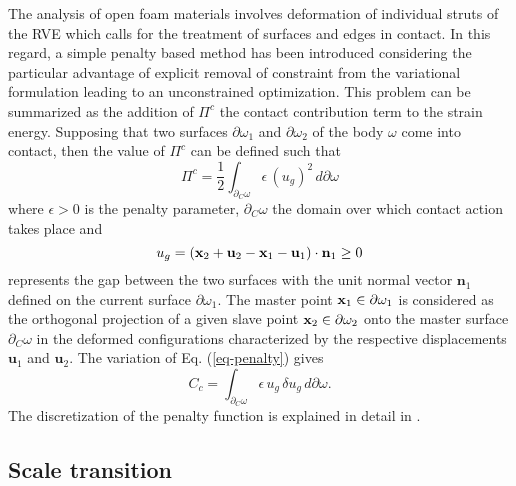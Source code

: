 The analysis of open foam materials involves deformation of individual struts of the RVE which calls for the treatment of surfaces and edges in contact. In this regard, a simple penalty based method has been introduced considering the particular advantage of explicit removal of constraint from the variational formulation leading to an unconstrained optimization\cite{laursenComputationalContactImpact2003}. This problem can be summarized as the addition of $ \Pi^c $ the contact contribution term to the strain energy. Supposing that two surfaces $ \partial\omega_1 $ and $ \partial\omega_2 $ of the body $ \omega $ come into contact, then the value of $ \Pi^c $ can be defined such that
\begin{equation}\label{eq-penalty}
\Pi^c = \frac{1}{2}\int_{\partial_C\omega}\epsilon\,(u_g)^2\,d\partial\omega
\end{equation}
where $ \epsilon>0 $ is the penalty parameter, $  \partial_C\omega $ the domain over which contact action takes place and 
\[ u_g=(\textbf x_2+\textbf{u}_2-\textbf x_1-\textbf{u}_1)\cdot\textbf{n}_1 \ge0\]  
represents the gap between the two surfaces with the unit normal vector $\textbf{n}_1$ defined on the current surface $ \partial\omega_1 $. The master point $ \textbf x_1\in\partial\omega_1 $ is considered as the orthogonal projection of a given slave point $ \textbf x_2\in\partial\omega_2 $ onto the master surface $ \partial_C\omega $ in the deformed configurations characterized by the respective displacements $ \textbf{u}_1 $ and $ \textbf{u}_2 $\cite{wriggersComputationalContactMechanics2006}. The variation of Eq. (\ref{eq-penalty}) gives
\begin{equation}\label{eq-penalty-2}
C_c=\int_{\partial_C\omega}\epsilon\,u_g\,\delta u_g\,d\partial\omega.
\end{equation}
The discretization of the penalty function is explained in detail in \cite{wriggersComputationalContactMechanics2006}.

\subsection{Scale transition}\label{ch-form-scale}


